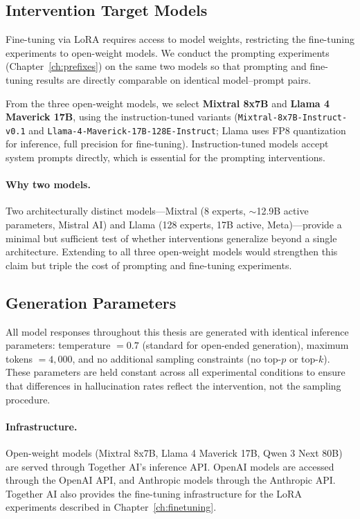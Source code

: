 \subsection{Intervention Target Models}
\label{sec:target-models}

Fine-tuning via LoRA \citep{hu2022lora} requires access to model weights, restricting the fine-tuning experiments to open-weight models. We conduct the prompting experiments (Chapter~\ref{ch:prefixes}) on the same two models so that prompting and fine-tuning results are directly comparable on identical model--prompt pairs.

From the three open-weight models, we select \textbf{Mixtral 8x7B} and \textbf{Llama 4 Maverick 17B}, using the instruction-tuned variants (\texttt{Mixtral-8x7B-Instruct-v0.1} and \texttt{Llama-4-Maverick-17B-128E-Instruct}; Llama uses FP8 quantization for inference, full precision for fine-tuning). Instruction-tuned models accept system prompts directly, which is essential for the prompting interventions.

\paragraph{Why two models.} Two architecturally distinct models---Mixtral (8 experts, $\sim$12.9B active parameters, Mistral AI) and Llama (128 experts, 17B active, Meta)---provide a minimal but sufficient test of whether interventions generalize beyond a single architecture. Extending to all three open-weight models would strengthen this claim but triple the cost of prompting and fine-tuning experiments.

\subsection{Generation Parameters}
\label{sec:generation}

All model responses throughout this thesis are generated with identical inference parameters: temperature $= 0.7$ (standard for open-ended generation), maximum tokens $= 4{,}000$, and no additional sampling constraints (no top-$p$ or top-$k$). These parameters are held constant across all experimental conditions to ensure that differences in hallucination rates reflect the intervention, not the sampling procedure.

\paragraph{Infrastructure.} Open-weight models (Mixtral 8x7B, Llama 4 Maverick 17B, Qwen 3 Next 80B) are served through Together AI's inference API. OpenAI models are accessed through the OpenAI API, and Anthropic models through the Anthropic API. Together AI also provides the fine-tuning infrastructure for the LoRA experiments described in Chapter~\ref{ch:finetuning}.

